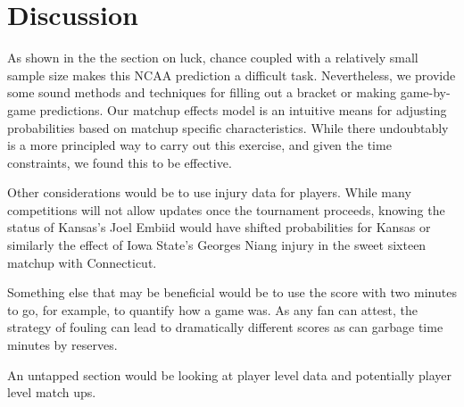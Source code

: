 \section{Discussion}
As shown in the the section on luck, chance coupled with a relatively small sample size makes this NCAA prediction a difficult task.  Nevertheless, we provide some sound methods and techniques for filling out a bracket or making game-by-game predictions.  Our matchup effects model is an intuitive means for adjusting probabilities based on matchup specific characteristics.  While there undoubtably is a more principled way to carry out this exercise, and given the time constraints, we found this to be effective.

Other considerations would be to use injury data for players.  While many competitions will not allow updates once the tournament proceeds, knowing the status of Kansas's Joel Embiid would have shifted probabilities for Kansas or similarly the effect of Iowa State's Georges Niang injury in the sweet sixteen matchup with Connecticut.

Something else that may be beneficial would be to use the score with two minutes to go, for example, to quantify how a game was.  As any fan can attest, the strategy of fouling can lead to dramatically different scores as can garbage time minutes by reserves. 

An untapped section would be looking at player level data and potentially player level match ups. 
